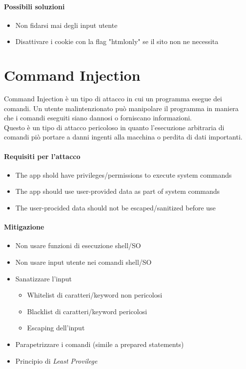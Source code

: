 \documentclass{article}
\begin{document}
\paragraph{Possibili soluzioni}
\begin{itemize}
    \item Non fidarsi mai degli input utente
    \item Disattivare i cookie con la flag "htmlonly" se il sito non ne necessita
\end{itemize}

\section{Command Injection}
Command Injection è un tipo di attacco in cui un programma esegue dei comandi. Un utente malintenzionato può manipolare il programma in maniera che i comandi eseguiti siano dannosi o forniscano informazioni. \\
Questo è un tipo di attacco pericoloso in quanto l'esecuzione arbitraria di comandi piò portare a danni ingenti alla macchina o perdita di dati importanti.
\paragraph{Requisiti per l'attacco}
\begin{itemize}
    \item The app shold have privileges/permissions to execute system commands
    \item The app should use user-provided data as part of system commands
    \item The user-procided data should not be escaped/sanitized before use
\end{itemize}

\paragraph{Mitigazione}
\begin{itemize}
    \item Non usare funzioni di esecuzione shell/SO
    \item Non usare input utente nei comandi shell/SO
    \item Sanatizzare l'input
        \begin{itemize}
            \item Whitelist di caratteri/keyword non pericolosi
            \item Blacklist di caratteri/keyword pericolosi
            \item Escaping dell'input
        \end{itemize}
    \item Parapetrizzare i comandi (simile a prepared statements)
    \item Principio di \textit{Least Provilege}
\end{itemize}
\end{document}
